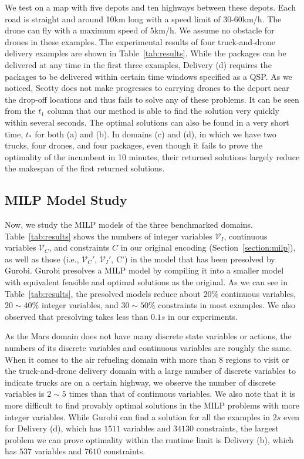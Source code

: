 \documentclass[sigconf]{acmart}
\begin{document}
We test on a map with five depots and ten highways between these depots. Each road is straight and around 10km long with a speed limit of 30-60km/h. The drone can fly with a maximum speed of 5km/h. We assume no obstacle for drones in these examples. The experimental results of four truck-and-drone delivery examples are shown in Table~\ref{tab:results}. While the packages can be delivered at any time in the first three examples, Delivery (d) requires the packages to be delivered within certain time windows specified as a QSP. As we noticed, Scotty does not make progresses to carrying drones to the deport near the drop-off locations and thus fails to solve any of these problems.  It can be seen from the $t_1$ column that our method is able to find the solution very quickly within several seconds. The optimal solutions can also be found in a very short time, $t_*$ for both (a) and (b). In domains (c) and (d), in which we have two trucks, four drones, and four packages, even though it fails to prove the optimality of the incumbent in 10 minutes, their returned solutions largely reduce the makespan of the first returned solutions.


\subsection{MILP Model Study}
Now, we study the MILP models of the three benchmarked domains. Table~\ref{tab:results} shows the numbers of integer variables $\mathcal{V}_I$, continuous variables $\mathcal{V}_C$, and constraints $C$ in our original encoding (Section~\ref{section:milp}), as well as those (i.e., $\mathcal{V}_C'$, $\mathcal{V}_I'$, C') in the model that has been presolved by Gurobi. Gurobi presolves a MILP model by compiling it into a smaller model with equivalent feasible and optimal solutions as the original. As we can see in Table~\ref{tab:results}, the presolved models reduce about $20\%$ continuous variables, $20 \sim 40\%$ integer variables, and $30 \sim 50 \%$ constraints in most examples. We also observed that presolving takes less than $0.1s$ in our experiments.


As the Mars domain does not have many discrete state variables or actions, the numbers of its discrete variables and continuous variables are roughly the same. When it comes to the air refueling domain with more than $8$ regions to visit or the truck-and-drone delivery domain with a large number of discrete variables to indicate trucks are on a certain highway, we observe the number of discrete variables is $2 \sim 5$ times than that of continuous variables. We also note that it is more difficult to find provably optimal solutions in the MILP problems with more integer variables. While Gurobi can find a solution for all the examples in $2s$ even for Delivery (d), which has $1511$ variables and $34130$ constraints, the largest problem we can prove optimality within the runtime limit is Delivery (b), which has $537$ variables and $7610$ constraints.
\end{document}
